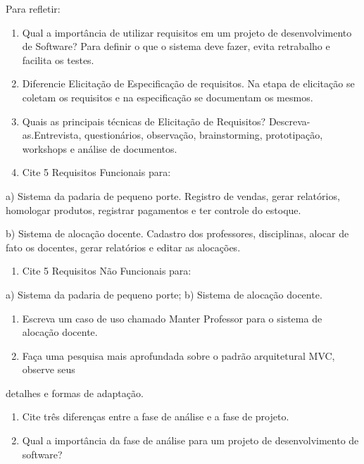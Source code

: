 \documentclass[11pt]{article}
\date{\today}
\title{}
\begin{document}
\tableofcontents

Para refletir:

\begin{enumerate}
\item Qual a importância de utilizar requisitos em um projeto de desenvolvimento de Software?
Para definir o que o sistema deve fazer, evita retrabalho e facilita os testes.
\item Diferencie Elicitação de Especificação de requisitos.
Na etapa de elicitação se coletam os requisitos e na especificação se documentam os mesmos.
\item Quais as principais técnicas de Elicitação de Requisitos? Descreva-as.Entrevista, questionários, observação, brainstorming, prototipação, workshops e análise de documentos.
\item Cite 5 Requisitos Funcionais para:
\end{enumerate}
a) Sistema da padaria de pequeno porte. 
Registro de vendas, gerar relatórios, homologar produtos, registrar pagamentos e ter controle do estoque.

b) Sistema de alocação docente. Cadastro dos professores, disciplinas, alocar de fato os docentes, gerar relatórios e editar as alocações.
\begin{enumerate}
\item Cite 5 Requisitos Não Funcionais para:
\end{enumerate}
a) Sistema da padaria de pequeno porte; 
b) Sistema de alocação docente.
\begin{enumerate}
\item Escreva um caso de uso chamado Manter Professor para o sistema de alocação docente.
\item Faça uma pesquisa mais aprofundada sobre o padrão arquitetural MVC, observe seus
\end{enumerate}
detalhes e formas de adaptação.
\begin{enumerate}
\item Cite três diferenças entre a fase de análise e a fase de projeto.
\item Qual a importância da fase de análise para um projeto de desenvolvimento de software?
\end{enumerate}


\end{document}
